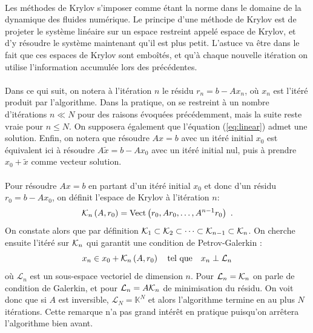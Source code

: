     \paragraph{}
    Les méthodes de Krylov  s'imposer comme étant la norme dans le domaine de la dynamique des fluides numérique.
    Le principe d'une méthode de Krylov est de projeter le système linéaire sur un espace restreint appelé espace de Krylov, et d'y résoudre le système maintenant qu'il est plus petit.
		L'astuce va être dans le fait que ces espaces de Krylov sont emboîtés, et qu'à chaque nouvelle itération on utilise l'information accumulée lors des précédentes.

		\paragraph{}
		Dans ce qui suit, on notera à l'itération $n$ le résidu $r_n = b - Ax_n$, où $x_n$ est l'itéré produit par l'algorithme.
		Dans la pratique, on se restreint à un nombre d'itérations $n\ll N$ pour des raisons évoquées précédemment, mais la suite reste vraie pour $n\le N$.
		On supposera également que l'équation (\ref{eq:linear}) admet une solution.
		Enfin, on notera que résoudre $Ax = b$ avec un itéré initial $x_0$ est équivalent ici à résoudre $A\tilde{x} = b - Ax_0$ avec un itéré initial nul, puis à prendre $x_0 + \tilde{x}$ comme vecteur solution.

		\paragraph{}
		Pour résoudre $Ax = b$ en partant d'un itéré initial $x_0$ et donc d'un résidu $r_0 = b - Ax_0$, on définit l'espace de Krylov à l'itération $n$:
		\begin{equation}\label{eqn:krylov}
			\krylov[A, r_0]{n} = \operatorname{Vect}\left(r_0, Ar_0, \dots, A^{n-1}r_0\right)\ .
		\end{equation}
		On constate alors que par définition $\krylov{1}\subset\krylov{2}\subset\dots\subset\krylov{n-1}\subset\krylov{n}$.
		On cherche ensuite l'itéré sur $\krylov{n}$ qui garantit une condition de Petrov-Galerkin \cite{SimonciniSzyld2007} :
		\begin{equation}\label{eqn:x_n}
			x_n \in x_0 + \krylov[A, r_0]{n}\quad\textrm{tel que}\quad x_n \perp \mathcal{L}_n
		\end{equation}
		où $\mathcal{L}_n$ est un sous-espace vectoriel de dimension $n$.
		Pour $\mathcal{L}_n = \krylov{n}$ on parle de condition de Galerkin, et pour $\mathcal{L}_n = A\krylov{n}$ de minimisation du résidu.
		On voit donc que si $A$ est inversible, $\mathcal{L}_N = \mathbb{K}^N$ et alors l'algorithme termine en au plus $N$ itérations.
		Cette remarque n'a pas grand intérêt en pratique puisqu'on arrêtera l'algorithme bien avant.

